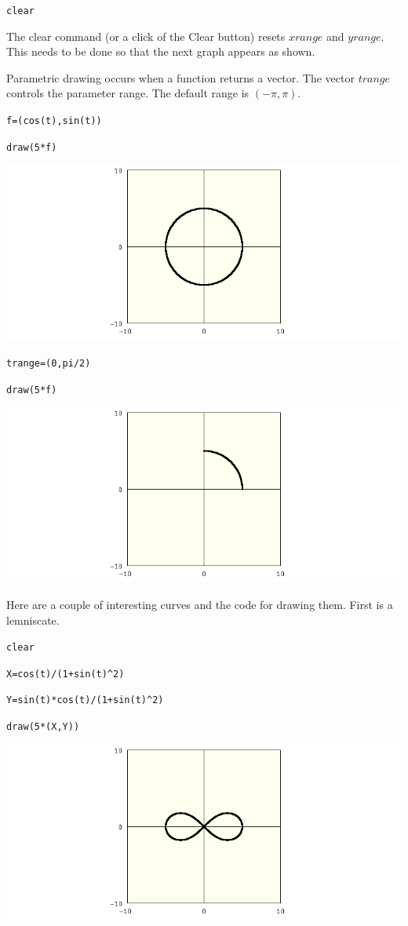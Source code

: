 \documentclass[12pt]{book}
\begin{document}
\verb$clear$

\medskip
\noindent
The clear command (or a click of the Clear button)
resets $xrange$ and $yrange$.
This needs to be done so that the next graph
appears as shown.

\newpage

\noindent
Parametric drawing occurs when a function returns a vector.
The vector $trange$ controls the parameter range.
The default range is $(-\pi,\pi)$.

\medskip
\verb$f=(cos(t),sin(t))$

\verb$draw(5*f)$

\medskip
\noindent
\includegraphics[scale=0.5]{circle.png}

\verb$trange=(0,pi/2)$

\verb$draw(5*f)$

\medskip
\noindent
\includegraphics[scale=0.5]{circle2.png}

\newpage

\noindent
Here are a couple of interesting curves and the code for drawing them.
First is a lemniscate.

\medskip
\verb$clear$

\verb$X=cos(t)/(1+sin(t)^2)$

\verb$Y=sin(t)*cos(t)/(1+sin(t)^2)$

\verb$draw(5*(X,Y))$

\medskip
\noindent
\includegraphics[scale=0.5]{lemniscate.png}
\end{document}
